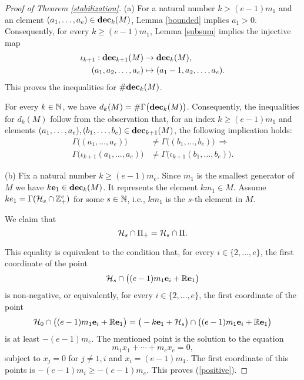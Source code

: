 \begin{proof}[Proof of Theorem \ref{stabilization}]
(a) For a natural number $k>(e-1)m_1$ and an element $(a_1,\ldots,a_e)\in\textbf{dec}_k(M)$, Lemma \ref{bounded} implies $a_1>0$. Consequently, for every $k\ge(e-1)m_1$, Lemma \ref{subsum} implies the injective map
\begin{align*}
\iota_{k+1}:\textbf{dec}_{k+1}(M)&\to\textbf{dec}_k(M),\\
(a_1,a_2,\ldots,a_e)&\mapsto(a_1-1,a_2,\ldots,a_e).
\end{align*}
This proves the inequalities for $\#\textbf{dec}_k(M)$.

For every $k\in\mathbb N$, we have $d_k(M)=\#\Gamma\big(\textbf{dec}_k(M)\big)$. Consequently, the inequalities for $d_k(M)$ follow from the observation that, for an index $k\ge(e-1)m_1$ and elements $(a_1,\ldots,a_e),(b_1,\ldots,b_e)\in\textbf{dec}_{k+1}(M)$, the following implication holds: 
\begin{align*}
\Gamma\big((a_1,\ldots,a_e)\big)&\not=\Gamma\big((b_1,\ldots,b_e)\big)\ \Longrightarrow\\
\Gamma\big(\iota_{k+1}(a_1,\ldots,a_e)\big)&\not=\Gamma\big(\iota_{k+1}(b_1,\ldots,b_e)\big).
\end{align*} 

\medskip(b) Fix a natural number $k\ge(e-1)m_e$. Since $m_1$ is the smallest generator of $M$ we have $k\mathbf{e}_1\in\textbf{dec}_k(M)$. It represents the element $km_1\in M$. Assume $ke_1=\Gamma(\mathcal{H}_s\cap\mathbb Z_+^e)$ for some $s\in\mathbb N$, i.e., $km_1$ is the $s$-th element in $M$. 

We claim that
\begin{equation}\label{positive}
\mathcal{H}_s\cap\Pi_+=\mathcal{H}_s\cap\Pi.
\end{equation}

This equality is equivalent to the condition that, for every $i\in\{2,\ldots,e\}$, the first coordinate of the point
\begin{align*}
\mathcal{H}_s\cap\big((e-1)m_1\mathbf{e}_i+\mathbb R\mathbf{e}_1\big)
\end{align*}
is non-negative, or equivalently, for every $i\in\{2,\ldots,e\}$, the first coordinate of the point
\begin{align*}
\mathcal{H}_0\cap\big((e-1)m_1\mathbf{e}_i+\mathbb R\mathbf{e}_1\big)=\big(-k\mathbf{e}_1+\mathcal{H}_s\big)\cap\big((e-1)m_1\mathbf{e}_i+\mathbb R\mathbf{e}_1\big)
\end{align*}
is at least $-(e-1)m_e$. The mentioned point is the solution to the equation
$$
m_1x_1+\cdots+m_ex_e=0,
$$
subject to $x_j=0$ for $j\not=1,i$ and $x_i=(e-1)m_1$. The first coordinate of this points is $-(e-1)m_i\ge-(e-1)m_e$.
This proves (\ref{positive}).


\end{proof}
